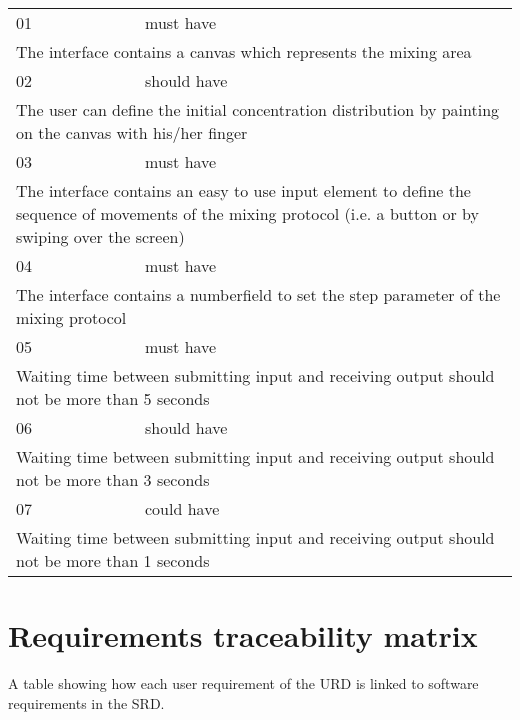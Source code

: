 \begin{center}
\begin{tabular}{ p{} p{}}

01 & must have \\
\multicolumn{2}{p{\textwidth}}{The interface contains a canvas which represents the mixing area} \\
\hline

02 & should have \\
\multicolumn{2}{p{\textwidth}}{The user can define the initial concentration distribution by painting on the canvas with his/her finger} \\
\hline

03 & must have \\
\multicolumn{2}{p{\textwidth}}{The interface contains an easy to use input element to define the sequence of movements of the mixing protocol (i.e. a button or by swiping over the screen)} \\
\hline

04 & must have \\
\multicolumn{2}{p{\textwidth}}{The interface contains a numberfield to set the step parameter of the mixing protocol} \\
\hline

05 & must have \\
\multicolumn{2}{p{\textwidth}}{Waiting time between submitting input and receiving output should not be more than 5 seconds} \\
\hline

06 & should have \\
\multicolumn{2}{p{\textwidth}}{Waiting time between submitting input and receiving output should not be more than 3 seconds} \\
\hline

07 & could have \\
\multicolumn{2}{p{\textwidth}}{Waiting time between submitting input and receiving output should not be more than 1 seconds} \\
\hline

\end{tabular}
\end{center}

\chapter{Requirements traceability matrix}
A table showing how each user requirement of the URD is linked to software requirements in the SRD.


